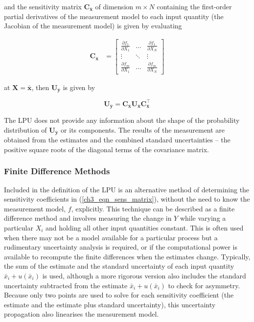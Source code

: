 \documentclass[../thesis/thesis.tex]{subfiles}
\begin{document}
\begin{refsection}
and the sensitivity matrix $\boldsymbol C_{\bar{\boldsymbol x}}$ of dimension $m \times N$ containing the first-order partial derivatives of the measurement model to each input quantity (the Jacobian of the measurement model) is given by evaluating

\begin{align}
\boldsymbol C_{\bar{\boldsymbol x}} & = 
\begin{bmatrix}
\displaystyle \frac{\partial f_1}{\partial X_1}&\dots&\displaystyle \frac{\partial f_1}{\partial X_N}\\
\vdots&\ddots&\vdots\\
\displaystyle \frac{\partial f_m}{\partial X_1}&\dots&\displaystyle \frac{\partial f_m}{\partial X_N}
\end{bmatrix}
\label{ch3_eqn_sens_matrix}
\end{align}

at $\boldsymbol X = \bar{\boldsymbol x}$, then $\boldsymbol U_{\bar{\boldsymbol y}}$ is given by

\begin{equation}
\boldsymbol U_{\bar{\boldsymbol y}} = \boldsymbol C_{\bar{\boldsymbol x}}\boldsymbol U_{\bar{\boldsymbol x}}\boldsymbol C_{\bar{\boldsymbol x}}^\top
\end{equation}

The LPU does not provide any information about the shape of the probability distribution of $\boldsymbol U_{\bar{\boldsymbol y}}$ or its components. The results of the measurement are obtained from the estimates and the combined standard uncertainties – the positive square roots of the diagonal terms of the covariance matrix.

\subsubsection{Finite Difference Methods} \label{ch3_sec_fd_methods}

Included in the definition of the LPU is an alternative method of determining the sensitivity coefficients in (\ref{ch3_eqn_sens_matrix}), without the need to know the measurement model, $f$, explicitly. This technique can be described as a finite difference method and involves measuring the change in $Y$ while varying a particular $X_i$ and holding all other input quantities constant. This is often used when there may not be a model available for a particular process but a rudimentary uncertainty analysis is required, or if the computational power is available to recompute the finite differences when the estimates change. Typically, the sum of the estimate and the standard uncertainty of each input quantity $\bar{x}_i + u(\bar{x}_i)$ is used, although a more rigorous version also includes the standard uncertainty subtracted from the estimate $\bar{x}_i + u(\bar{x}_i)$ to check for asymmetry. Because only two points are used to solve for each sensitivity coefficient (the estimate and the estimate plus standard uncertainty), this uncertainty propagation also linearises the measurement model.


\end{refsection}
\end{document}
